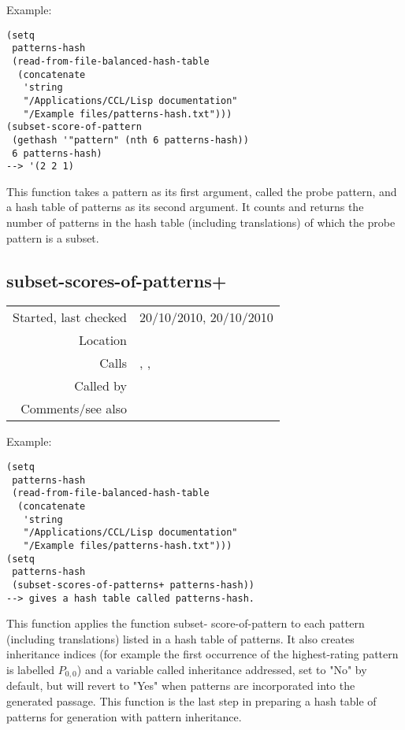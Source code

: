 \vspace{0.5cm}
\noindent Example:
\begin{verbatim}
(setq
 patterns-hash
 (read-from-file-balanced-hash-table
  (concatenate
   'string
   "/Applications/CCL/Lisp documentation"
   "/Example files/patterns-hash.txt")))
(subset-score-of-pattern
 (gethash '"pattern" (nth 6 patterns-hash))
 6 patterns-hash)
--> '(2 2 1)
\end{verbatim}

\noindent This function takes a pattern as its first
argument, called the probe pattern, and a hash table
of patterns as its second argument. It counts and
returns the number of patterns in the hash table
(including translations) of which the probe pattern is
a subset.


\subsection*{subset-scores-of-patterns+}\label{fun:subset-scores-of-patterns+}

\vspace{0.3cm}
\begin{tabular}{r|p{8cm}}
Started, last checked & 20/10/2010, 20/10/2010 \\
Location & \nameref{sec:pattern-inheritance-preliminaries} \\
Calls & \nameref{fun:first-n-naturals}, \nameref{fun:subset-score-of-pattern},\newline \nameref{fun:translations} \\
Called by & \nameref{fun:subset-scores-of-patterns+} \\
Comments/see also & 
\end{tabular}

\vspace{0.5cm}
\noindent Example:
\begin{verbatim}
(setq
 patterns-hash
 (read-from-file-balanced-hash-table
  (concatenate
   'string
   "/Applications/CCL/Lisp documentation"
   "/Example files/patterns-hash.txt")))
(setq
 patterns-hash
 (subset-scores-of-patterns+ patterns-hash))
--> gives a hash table called patterns-hash.
\end{verbatim}

\noindent This function applies the function subset-
score-of-pattern to each pattern (including
translations) listed in a hash table of patterns. It
also creates inheritance indices (for example the
first occurrence of the highest-rating pattern is
labelled $P_{0,0}$) and a variable called inheritance
addressed, set to "No" by default, but will revert to
"Yes" when patterns are incorporated into the
generated passage. This function is the last step in
preparing a hash table of patterns for generation with
pattern inheritance.


